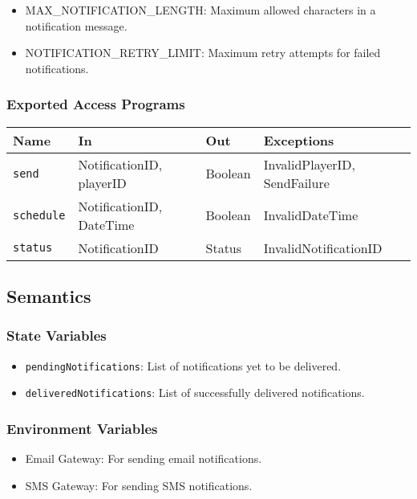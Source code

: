 \documentclass[12pt, titlepage]{article}
\begin{document}
\begin{itemize}
    \item MAX\_NOTIFICATION\_LENGTH: Maximum allowed characters in a notification message.
    \item NOTIFICATION\_RETRY\_LIMIT: Maximum retry attempts for failed notifications.
\end{itemize}

\subsubsection{Exported Access Programs}

\begin{center}
\begin{tabular}{p{2cm} p{4cm} p{4cm} p{2cm}}
\hline
\textbf{Name} & \textbf{In} & \textbf{Out} & \textbf{Exceptions} \\
\hline
\texttt{send} & NotificationID, playerID & Boolean & InvalidPlayerID, SendFailure \\
\hline
\texttt{schedule} & NotificationID, DateTime & Boolean & InvalidDateTime \\
\hline
\texttt{status} & NotificationID & Status & InvalidNotificationID \\
\hline
\end{tabular}
\end{center}

\subsection{Semantics}

\subsubsection{State Variables}

\begin{itemize}
    \item \texttt{pendingNotifications}: List of notifications yet to be delivered.
    \item \texttt{deliveredNotifications}: List of successfully delivered notifications.
\end{itemize}

\subsubsection{Environment Variables}

\begin{itemize}
    \item Email Gateway: For sending email notifications.
    \item SMS Gateway: For sending SMS notifications.
\end{itemize}
\end{document}
